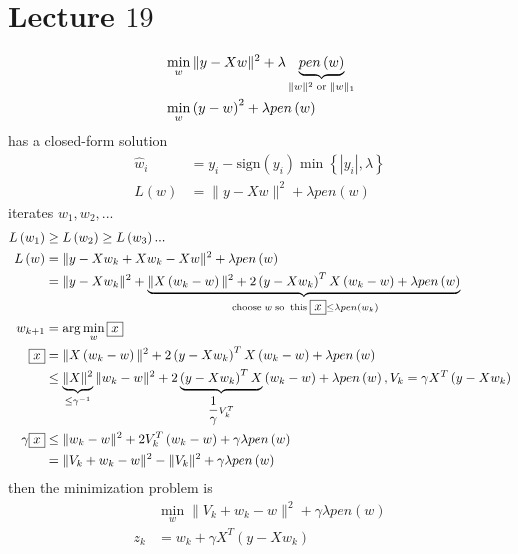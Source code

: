 \documentclass{article}
\begin{document}
\section{Lecture $19$} 
\begin{align*}
&\displaystyle\min_{w} \| y - X w \|^{2} + \lambda \underbrace{pen\left(w \right)}_{\| w \|^{2} \text{\;or\;} \| w \|_{1}}
\\ &\displaystyle\min_{w} \left(y - w\right)^{2} + \lambda pen\left(w \right)
\end{align*}
has a closed-form solution
\begin{align*}
\hat{w}_{i} &= y_{i} - \text{sign}\left(y_{i}\right) \displaystyle\min\left\{| y_{i} |, \lambda\right\}
\\ L\left(w\right)  &= \| y - X w \|^{2} + \lambda pen\left(w \right)
\end{align*}
iterates $w_{1}, w_{2}, ...$
\begin{align*}
L\left(w_{1}\right)  &\geq  L\left(w_{2}\right) \geq  L\left(w_{3}\right) ...
\\ L\left(w\right)  &= \| y - X w_{k} + X w_{k} - X w \|^{2} + \lambda pen\left(w \right)
\\ &= \| y - X w_{k} \|^{2} + \underbrace{\| X \left(w_{k} - w\right) \|^{2} + 2 \left(y - X w_{k}\right)^{T} X \left(w_{k} - w\right) + \lambda pen\left(w \right)}_{\text{\;choose\;} w \text{\;so\;} \text{\;this\;} \boxed{x} \leq  \lambda pen\left(w_{k}\right)}
\\ w_{k+1} &= \arg\displaystyle\min_{w} \boxed{x}
\\ \boxed{x} &= \| X \left(w_{k} - w\right) \|^{2} + 2 \left(y - X w_{k}\right)^{T} X \left(w_{k} - w\right) + \lambda pen\left(w \right)
\\ &\leq  \underbrace{\| X \|^{2}}_{\leq  \gamma^{-1}} \| w_{k} - w \|^{2} + 2 \underbrace{\left(y - X w_{k}\right)^{T} X}_{\dfrac{1}{\gamma} V_{k}^{T}} \left(w_{k} - w\right) + \lambda pen\left(w \right), V_{k} = \gamma X^{T} \left(y - X w_{k}\right)
\\ \gamma \boxed{x} &\leq  \| w_{k} - w \|^{2} + 2 V_{k}^{T} \left(w_{k} - w\right) + \gamma \lambda pen\left(w \right)
\\ &= \| V_{k} + w_{k} - w \|^{2} - \| V_{k} \|^{2} + \gamma \lambda pen\left(w \right)
\end{align*}
then the minimization problem is
\begin{align*}
&\displaystyle\min_{w} \| V_{k} + w_{k}  - w \|^{2} + \gamma \lambda pen\left(w \right)
\\ z_{k} &= w_{k} + \gamma X^{T} \left(y - X w_{k}\right)
\end{align*}
\end{document}
